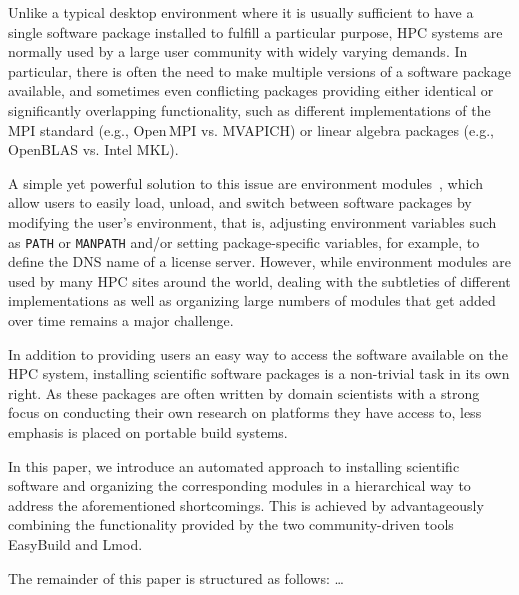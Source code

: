 Unlike a typical desktop environment where it is usually sufficient to have a
single software package installed to fulfill a particular purpose, HPC
systems are normally used by a large user community with widely varying
demands. In particular, there is often the need to make multiple versions of
a software package available, and sometimes even conflicting packages
providing either identical or significantly overlapping functionality, such
as different implementations of the MPI standard (e.g., Open\,MPI vs.
MVAPICH) or linear algebra packages (e.g., OpenBLAS vs. Intel MKL).

A simple yet powerful solution to this issue are environment
modules~\cite{environment_modules_paper}, which allow users to easily load,
unload, and switch between software packages by  modifying the user's
environment, that is, adjusting environment variables such as \texttt{PATH}
or \texttt{MANPATH} and/or setting package-specific variables, for example,
to define the DNS name of a license server. However, while environment
modules are used by many HPC sites around the world, dealing with the
subtleties of different implementations as well as organizing large numbers
of modules that get added over time remains a major challenge.

In addition to providing users an easy way to access the software available
on the HPC system, installing scientific software packages is a non-trivial
task in its own right. As these packages are often written by domain
scientists with a strong focus on conducting their own research on platforms
they have access to, less emphasis is placed on portable build systems.

In this paper, we introduce an automated approach to installing scientific
software and organizing the corresponding modules in a hierarchical way to
address the aforementioned shortcomings. This is achieved by advantageously
combining the functionality provided by the two community-driven tools
EasyBuild and Lmod.

The remainder of this paper is structured as follows: \ldots

